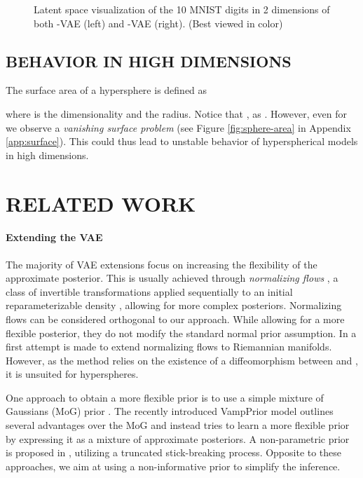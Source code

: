 \documentclass[letterpaper]{article}
\begin{document}
\begin{figure*}[t]
\centering
     \hspace{5em}
      \caption{Latent space visualization of the 10 MNIST digits in 2 dimensions of both -VAE (left) and -VAE (right). (Best viewed in color)}
      \label{fig:latent_mnist_z2}
\end{figure*}

\subsection{BEHAVIOR IN HIGH DIMENSIONS}\label{subsec:high-dim}
The surface area of a hypersphere is defined as

where  is the dimensionality and  the radius. Notice that , as . However, even for  we observe a \textit{vanishing surface problem} (see Figure \ref{fig:sphere-area} in Appendix \ref{app:surface}). This could thus lead to unstable behavior of hyperspherical models in high dimensions.

\section{RELATED WORK} \label{sec:related-work}

\label{par:vae-ext}
\paragraph{Extending the VAE} The majority of VAE extensions focus on increasing the flexibility of the approximate posterior. This is usually achieved through \textit{normalizing flows} \citep{normalizing-flows}, a class of invertible transformations applied sequentially to an initial reparameterizable density , allowing for more complex posteriors. Normalizing flows can be considered orthogonal to our approach. While allowing for a more flexible posterior, they do not modify the standard normal prior assumption. In \citep{gemici2016normalizing} a first attempt is made to extend normalizing flows to Riemannian manifolds. However, as the method relies on the existence of a diffeomorphism between  and , it is unsuited for hyperspheres.

One approach to obtain a more flexible prior is to use a simple mixture of Gaussians (MoG) prior \citep{gmm-prior-vae}. The recently introduced VampPrior model \citep{vamp-prior} outlines several advantages over the MoG and instead tries to learn a more flexible prior by expressing it as a mixture of approximate posteriors. A non-parametric prior is proposed in \citet{stick}, utilizing a truncated stick-breaking process. Opposite to these approaches, we aim at using a non-informative prior to simplify the inference.
\end{document}

